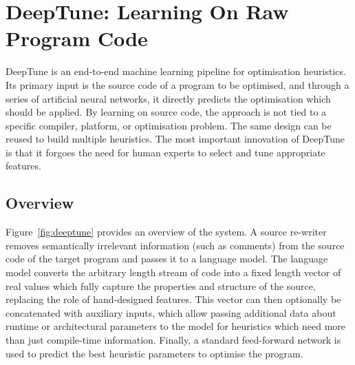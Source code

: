 \section{DeepTune: Learning On Raw Program Code}%
\label{sec:deeptune}

DeepTune is an end-to-end machine learning pipeline for optimisation heuristics. Its primary input is the source code of a program to be optimised, and through a series of artificial neural networks, it directly predicts the optimisation which should be applied. By learning on source code, the approach is not tied to a specific compiler, platform, or optimisation problem. The same design can be reused to build multiple heuristics. The most important innovation of DeepTune is that it forgoes the need for human experts to select and tune appropriate features.


\subsection{Overview}

Figure~\ref{fig:deeptune} provides an overview of the system. A source re-writer removes semantically irrelevant information (such as comments) from the source code of the target program and passes it to a language model. The language model converts the arbitrary length stream of code into a fixed length vector of real values which fully capture the properties and structure of the source, replacing the role of hand-designed features. This vector can then optionally be concatenated with auxiliary inputs, which allow passing additional data about runtime or architectural parameters to the model for heuristics which need more than just compile-time information. Finally, a standard feed-forward network is used to predict the best heuristic parameters to optimise the program.


